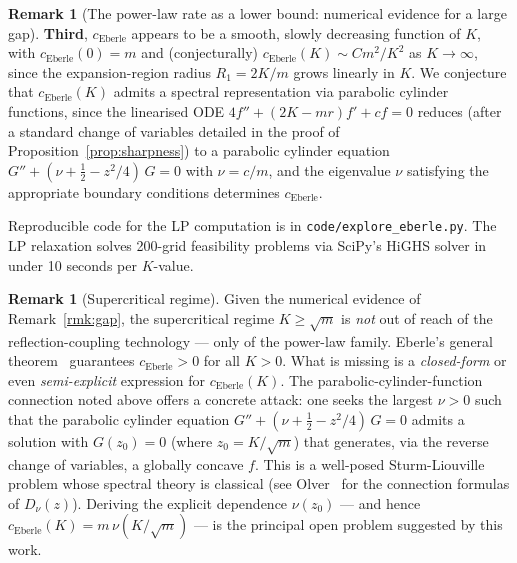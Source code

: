 \documentclass[11pt]{article}
\theoremstyle{definition}
\newtheorem{remark}[theorem]{Remark}
\begin{document}
\begin{remark}[The power-law rate as a lower bound: numerical evidence for a large gap]
\textbf{Third}, $c_{\mathrm{Eberle}}$ appears to be a smooth, slowly decreasing function of $K$, with $c_{\mathrm{Eberle}}(0) = m$ and (conjecturally) $c_{\mathrm{Eberle}}(K) \sim C m^2 / K^2$ as $K \to \infty$, since the expansion-region radius $R_1 = 2K/m$ grows linearly in $K$. We conjecture that $c_{\mathrm{Eberle}}(K)$ admits a spectral representation via parabolic cylinder functions, since the linearised ODE $4 f'' + (2K - mr)f' + c f = 0$ reduces (after a standard change of variables detailed in the proof of Proposition~\ref{prop:sharpness}) to a parabolic cylinder equation $G'' + (\nu + \tfrac12 - z^2/4)\,G = 0$ with $\nu = c/m$, and the eigenvalue $\nu$ satisfying the appropriate boundary conditions determines $c_{\mathrm{Eberle}}$.

Reproducible code for the LP computation is in \texttt{code/explore\_eberle.py}. The LP relaxation solves 200-grid feasibility problems via SciPy's HiGHS solver in under 10 seconds per $K$-value.
\end{remark}

\begin{remark}[Supercritical regime]\label{rmk:supercritical}
Given the numerical evidence of Remark~\ref{rmk:gap}, the supercritical regime $K \ge \sqrt m$ is \emph{not} out of reach of the reflection-coupling technology --- only of the power-law family. Eberle's general theorem~\cite{Eberle2016} guarantees $c_{\mathrm{Eberle}} > 0$ for all $K > 0$. What is missing is a \emph{closed-form} or even \emph{semi-explicit} expression for $c_{\mathrm{Eberle}}(K)$. The parabolic-cylinder-function connection noted above offers a concrete attack: one seeks the largest $\nu > 0$ such that the parabolic cylinder equation $G'' + (\nu + \tfrac12 - z^2/4)\,G = 0$ admits a solution with $G(z_0) = 0$ (where $z_0 = K/\sqrt m$) that generates, via the reverse change of variables, a globally concave $f$. This is a well-posed Sturm-Liouville problem whose spectral theory is classical (see Olver~\cite{Villani2009} for the connection formulas of $D_\nu(z)$). Deriving the explicit dependence $\nu(z_0)$ --- and hence $c_{\mathrm{Eberle}}(K) = m\,\nu(K/\sqrt m)$ --- is the principal open problem suggested by this work.
\end{remark}
\end{document}

